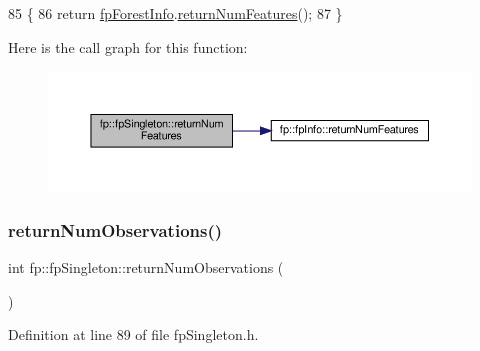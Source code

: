 \begin{DoxyCode}
85                                           \{
86                 \textcolor{keywordflow}{return} \hyperlink{classfp_1_1fpSingleton_a85965009befa72a749ae498fa5b6ccfa}{fpForestInfo}.\hyperlink{classfp_1_1fpInfo_abf1e1bfc3e7daa178f3d68bed6311edb}{returnNumFeatures}();
87             \}
\end{DoxyCode}
Here is the call graph for this function\+:\nopagebreak
\begin{figure}[H]
\begin{center}
\leavevmode
\includegraphics[width=350pt]{classfp_1_1fpSingleton_a97cbcad5ae9daa8c747fd4db84928c20_cgraph}
\end{center}
\end{figure}
\mbox{\label{classfp_1_1fpSingleton_ae12f22ad096ff0d419fce47df710bf78}} 
\subsubsection{\texorpdfstring{return\+Num\+Observations()}{returnNumObservations()}}
{\footnotesize\ttfamily int fp\+::fp\+Singleton\+::return\+Num\+Observations (\begin{DoxyParamCaption}{ }\end{DoxyParamCaption})\hspace{0.3cm}{\ttfamily [inline]}}



Definition at line 89 of file fp\+Singleton.\+h.


